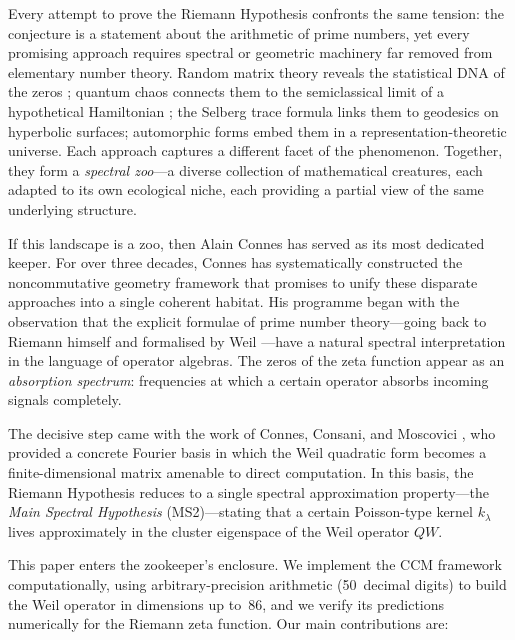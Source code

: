 \documentclass[12pt,a4paper]{article}
\theoremstyle{definition}
\theoremstyle{remark}
\begin{document}
Every attempt to prove the Riemann Hypothesis confronts the same tension:
the conjecture is a statement about the arithmetic of prime numbers,
yet every promising approach requires spectral or geometric machinery
far removed from elementary number theory.
Random matrix theory reveals the statistical DNA of the zeros
\cite{Montgomery1973,Odlyzko1987};
quantum chaos connects them to the semiclassical limit of a
hypothetical Hamiltonian \cite{BerryKeating1999};
the Selberg trace formula links them to geodesics on hyperbolic surfaces;
automorphic forms embed them in a representation-theoretic universe.
Each approach captures a different facet of the phenomenon.
Together, they form a \emph{spectral zoo}---a diverse collection of
mathematical creatures, each adapted to its own ecological niche,
each providing a partial view of the same underlying structure.

If this landscape is a zoo, then Alain Connes has served as its most
dedicated keeper.
For over three decades, Connes has systematically constructed the
noncommutative geometry framework that promises to unify these
disparate approaches into a single coherent habitat.
His programme began with the observation that the explicit formulae of
prime number theory---going back to Riemann himself and formalised by
Weil \cite{Weil1952}---have a natural spectral interpretation in the
language of operator algebras.
The zeros of the zeta function appear as an \emph{absorption spectrum}:
frequencies at which a certain operator absorbs incoming signals completely.

The decisive step came with the work of Connes, Consani, and Moscovici
\cite{CCM2025}, who provided a concrete Fourier basis
in which the Weil quadratic form becomes a finite-dimensional matrix
amenable to direct computation.
In this basis, the Riemann Hypothesis reduces to a single spectral
approximation property---the \emph{Main Spectral Hypothesis} (MS2)---stating
that a certain Poisson-type kernel $k_\lambda$ lives approximately
in the cluster eigenspace of the Weil operator $QW$.

This paper enters the zookeeper's enclosure.
We implement the CCM framework computationally, using arbitrary-precision
arithmetic (50~decimal digits) to build the Weil operator in dimensions
up to~$86$, and we verify its predictions numerically for the Riemann
zeta function.
Our main contributions are:
\end{document}
